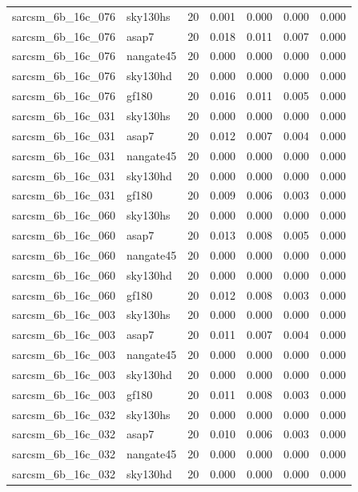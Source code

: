 \begin{tabular}{llrrrrr}
sarcsm\_6b\_16c\_076 & sky130hs & 20 & 0.001 & 0.000 & 0.000 & 0.000 \\
sarcsm\_6b\_16c\_076 & asap7 & 20 & 0.018 & 0.011 & 0.007 & 0.000 \\
sarcsm\_6b\_16c\_076 & nangate45 & 20 & 0.000 & 0.000 & 0.000 & 0.000 \\
sarcsm\_6b\_16c\_076 & sky130hd & 20 & 0.000 & 0.000 & 0.000 & 0.000 \\
sarcsm\_6b\_16c\_076 & gf180 & 20 & 0.016 & 0.011 & 0.005 & 0.000 \\
sarcsm\_6b\_16c\_031 & sky130hs & 20 & 0.000 & 0.000 & 0.000 & 0.000 \\
sarcsm\_6b\_16c\_031 & asap7 & 20 & 0.012 & 0.007 & 0.004 & 0.000 \\
sarcsm\_6b\_16c\_031 & nangate45 & 20 & 0.000 & 0.000 & 0.000 & 0.000 \\
sarcsm\_6b\_16c\_031 & sky130hd & 20 & 0.000 & 0.000 & 0.000 & 0.000 \\
sarcsm\_6b\_16c\_031 & gf180 & 20 & 0.009 & 0.006 & 0.003 & 0.000 \\
sarcsm\_6b\_16c\_060 & sky130hs & 20 & 0.000 & 0.000 & 0.000 & 0.000 \\
sarcsm\_6b\_16c\_060 & asap7 & 20 & 0.013 & 0.008 & 0.005 & 0.000 \\
sarcsm\_6b\_16c\_060 & nangate45 & 20 & 0.000 & 0.000 & 0.000 & 0.000 \\
sarcsm\_6b\_16c\_060 & sky130hd & 20 & 0.000 & 0.000 & 0.000 & 0.000 \\
sarcsm\_6b\_16c\_060 & gf180 & 20 & 0.012 & 0.008 & 0.003 & 0.000 \\
sarcsm\_6b\_16c\_003 & sky130hs & 20 & 0.000 & 0.000 & 0.000 & 0.000 \\
sarcsm\_6b\_16c\_003 & asap7 & 20 & 0.011 & 0.007 & 0.004 & 0.000 \\
sarcsm\_6b\_16c\_003 & nangate45 & 20 & 0.000 & 0.000 & 0.000 & 0.000 \\
sarcsm\_6b\_16c\_003 & sky130hd & 20 & 0.000 & 0.000 & 0.000 & 0.000 \\
sarcsm\_6b\_16c\_003 & gf180 & 20 & 0.011 & 0.008 & 0.003 & 0.000 \\
sarcsm\_6b\_16c\_032 & sky130hs & 20 & 0.000 & 0.000 & 0.000 & 0.000 \\
sarcsm\_6b\_16c\_032 & asap7 & 20 & 0.010 & 0.006 & 0.003 & 0.000 \\
sarcsm\_6b\_16c\_032 & nangate45 & 20 & 0.000 & 0.000 & 0.000 & 0.000 \\
sarcsm\_6b\_16c\_032 & sky130hd & 20 & 0.000 & 0.000 & 0.000 & 0.000 \\

\end{tabular}
